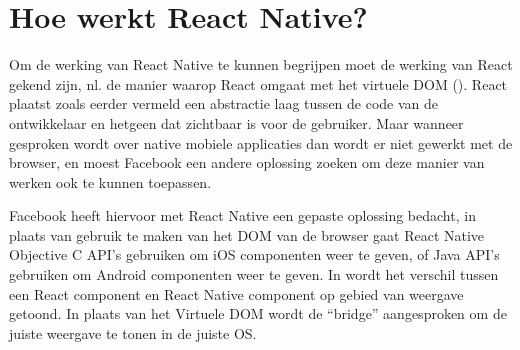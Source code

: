 \section{Hoe werkt React Native?}
Om de werking van React Native te kunnen begrijpen moet de werking van React gekend zijn, nl. de manier waarop React omgaat met het virtuele DOM (). React plaatst zoals eerder vermeld een abstractie laag tussen de code van de ontwikkelaar en hetgeen dat zichtbaar is voor de gebruiker. Maar wanneer gesproken wordt over native mobiele applicaties dan wordt er niet gewerkt met de browser, en moest Facebook een andere oplossing zoeken om deze manier van werken ook te kunnen toepassen. 

Facebook heeft hiervoor met React Native een gepaste oplossing bedacht, in plaats van gebruik te maken van het DOM van de browser gaat React Native Objective C API’s gebruiken om iOS componenten weer te geven, of Java API’s gebruiken om Android componenten weer te geven.  In  wordt het verschil tussen een React component en React Native component op gebied van weergave getoond. In plaats van het Virtuele DOM wordt de “bridge” aangesproken om de juiste weergave te tonen in de juiste OS.  

